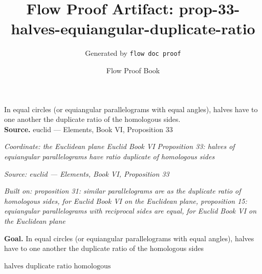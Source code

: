 \documentclass[11pt]{article}
\title{Flow Proof Artifact: prop-33-halves-equiangular-duplicate-ratio}
\author{Generated by \texttt{flow doc proof}}
\date{Flow Proof Book}
\theoremstyle{definition}
\begin{document}
\maketitle
In equal circles (or equiangular parallelograms with equal angles), halves have to one another the duplicate ratio of the homologous sides.\\[0.5em]
\textbf{Source.} euclid — Elements, Book VI, Proposition 33\\[0.5em]
\bigskip
{}\par
\smallskip\noindent\textit{Coordinate: the Euclidean plane \cdot Euclid Book VI \cdot Proposition 33: halves of equiangular parallelograms have ratio duplicate of homologous sides}\par
\smallskip\noindent\textit{Source: euclid — Elements, Book VI, Proposition 33}\par
\smallskip\noindent\textit{Built on: proposition 31: similar parallelograms are as the duplicate ratio of homologous sides, for Euclid Book VI on the Euclidean plane, proposition 15: equiangular parallelograms with reciprocal sides are equal, for Euclid Book VI on the Euclidean plane}\par
\medskip
\noindent\textbf{Goal.} In equal circles (or equiangular parallelograms with equal angles), halves have to one another the duplicate ratio of the homologous sides\par
\noindent$\displaystyle \text{halves duplicate ratio homologous}$\par
\medskip
\noindent
\end{document}
